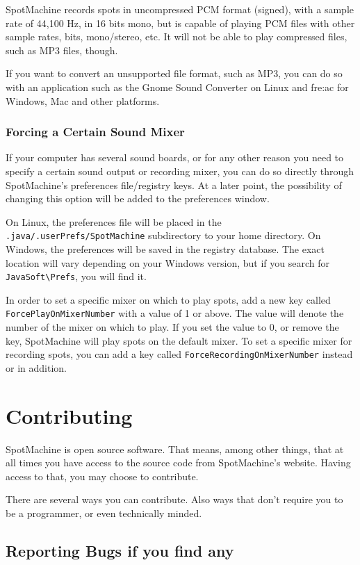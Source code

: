 \documentclass[a4paper,12pt]{report}
\begin{document}
SpotMachine records spots in uncompressed PCM format (signed), with a sample
rate of 44,100 Hz, in 16 bits mono, but is capable of playing PCM files with
other sample rates, bits, mono/stereo, etc. It will not be able to play
compressed files, such as MP3 files, though.

If you want to convert an unsupported file format, such as MP3, you can do so with
an application such as the Gnome Sound Converter on Linux and fre:ac for Windows,
Mac and other platforms.

\subsection{Forcing a Certain Sound Mixer}
If your computer has several sound boards, or for any other reason you need to specify
a certain sound output or recording mixer, you can do so directly through SpotMachine's
preferences file/registry keys. At a later point, the possibility of changing this
option will be added to the preferences window.

On Linux, the preferences file will be placed in the \texttt{.java/.userPrefs/SpotMachine}
subdirectory to your home directory. On Windows, the preferences will be saved in the
registry database. The exact location will vary depending on your Windows version, but
if you search for \texttt{JavaSoft\textbackslash{}Prefs}, you will find it.

In order to set a specific mixer on which to play spots, add a new key called
\texttt{ForcePlayOnMixerNumber} with a value of 1 or above. The value will denote the
number of the mixer on which to play. If you set the value to 0, or remove the key,
SpotMachine will play spots on the default mixer. To set a specific mixer for recording
spots, you can add a key called \texttt{ForceRecordingOnMixerNumber} instead or in
addition.

\chapter{Contributing}

SpotMachine is open source software. That means, among other things, that at all
times you have access to the source code from SpotMachine's website. Having
access to that, you may choose to contribute.

There are several ways you can contribute. Also ways that don't require you to
be a programmer, or even technically minded.

\section{Reporting Bugs if you find any}
\end{document}
